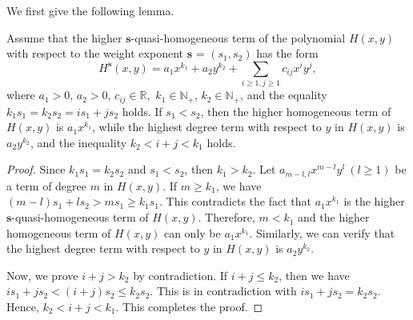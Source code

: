 \documentclass[reqno]{amsart}
\begin{document}
We first give the following lemma.

\begin{lemma}\label{lem3.2}
Assume that the higher $\mathbf{s}$-quasi-homogeneous term of the polynomial $H(x,y)$ 
with respect to the weight exponent $\mathbf{s}$ = $(s_1,s_2)$ has the  form
\[
H^{\mathbf{s}}(x,y)=a_1x^{k_1}+a_2y^{k_2}+\sum_{i\geq 1, j\geq 1} c_{ij}x^{i}y^{j},
\]
where $a_1>0$, $a_2>0$, $c_{ij}\in \mathbb{R}, $ $k_1\in \mathbb{N}_+$, 
$k_2\in \mathbb{N}_+$, and the equality $k_1s_1=k_2s_2=is_1+js_2$ holds. 
If $s_1<s_2$, then the higher homogeneous term of $H(x,y)$ is $a_1x^{k_1}$, while 
the highest degree term with respect to $y$ in $H(x,y)$ is $a_2y^{k_2}$, and the 
inequality $k_2<i+j<k_1$ holds.
\end{lemma}

\begin{proof}
Since $k_1s_1=k_2s_2$ and $s_1<s_2$, then $k_1>k_2$. 
Let $a_{m-l,l}x^{m-l}y^{l}\ (l\geq 1)$ be a term of degree $m$ in $H(x,y)$. 
If $m\geq k_1$, we have $(m-l)s_1+ls_2> ms_1\geq k_1s_1$. This contradicts the fact 
that $a_1x^{k_1}$ is the higher $\mathbf{s}$-quasi-homogeneous term of $H(x,y)$. 
Therefore, $m<k_1$ and the higher homogeneous term of $H(x,y)$ can only be $a_1x^{k_1}$. 
Similarly, we can verify that the highest degree term with respect to $y$ in $H(x,y)$ 
is $a_2y^{k_2}$.

Now, we prove $i+j > k_2$ by contradiction. If $i+j\leq k_2$, then we have 
$is_1+js_2<(i+j)s_2\leq k_2s_2$. This is in contradiction with $is_1+js_2=k_2s_2$. 
Hence, $k_2<i+j<k_1$.
This completes the proof.
\end{proof}
\end{document}
